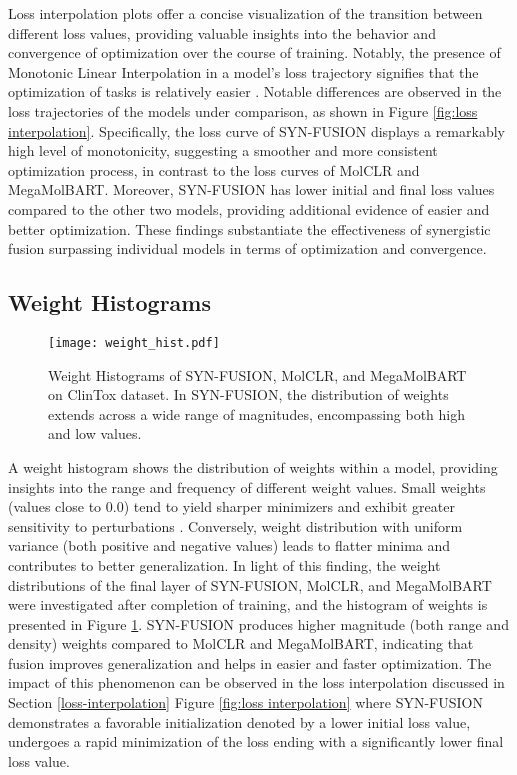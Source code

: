 \documentclass[sigconf,nonacm]{acmart}
\begin{document}
Loss interpolation plots offer a concise visualization of the transition between different loss values, providing valuable insights into the behavior and convergence of optimization over the course of training. Notably, the presence of Monotonic Linear Interpolation in a model's loss trajectory signifies that the optimization of tasks is relatively easier \cite{DBLP:journals/corr/GoodfellowV14}. 
Notable differences are observed in the loss trajectories of the models under comparison, as shown in Figure \ref{fig:loss interpolation}. Specifically, the loss curve of SYN-FUSION displays a remarkably high level of monotonicity, suggesting a smoother and more consistent optimization process, in contrast to the  loss curves of MolCLR and MegaMolBART. Moreover, SYN-FUSION has lower initial and final loss values compared to the other two models, providing additional evidence of easier and better optimization.
These findings substantiate the effectiveness of synergistic fusion surpassing individual models in terms of optimization and convergence.

\subsection{Weight Histograms}
\begin{figure}[!t]
  \centering
\texttt{[image: weight\_hist.pdf]}
  \caption{Weight Histograms of SYN-FUSION, MolCLR, and MegaMolBART on ClinTox dataset. In SYN-FUSION, the distribution of weights extends across a wide range of magnitudes, encompassing both high and low values.}
  \label{fig: weight hist}
  
\end{figure}
A weight histogram shows the distribution of weights within a model, providing insights into the range and frequency of different weight values. Small weights (values close to 0.0) tend to yield sharper minimizers and exhibit greater sensitivity to perturbations \cite{NEURIPS2018_a41b3bb3}. 
Conversely, weight distribution with uniform variance (both positive and negative values) leads to flatter minima and contributes to better generalization.
In light of this finding, the weight distributions of the final layer of SYN-FUSION, MolCLR, and MegaMolBART were investigated after completion of training, and the histogram of weights is presented in Figure \ref{fig: weight hist}. SYN-FUSION produces higher magnitude (both range and density) weights compared to MolCLR and MegaMolBART, indicating that fusion improves generalization and helps in easier and faster optimization. The impact of this phenomenon can be observed in the loss interpolation discussed in Section \ref{loss-interpolation}  Figure \ref{fig:loss interpolation} where SYN-FUSION demonstrates a favorable initialization denoted by a lower initial loss value, undergoes a rapid minimization of the loss ending with a significantly lower final loss value.
\end{document}
